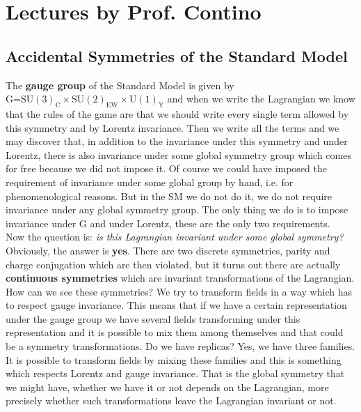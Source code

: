 \documentclass[../main.tex]{subfiles}
\begin{document}
\setchapterpreamble[u]{\margintoc}
\chapter[Lectures by Prof. Contino]{Lectures by Prof. Contino\footnotemark[0]}
\section{Accidental Symmetries of the Standard Model}
The \textbf{gauge group} of the Standard Model is given by\\ G=SU$(3)_{\text{C}}\times$SU$(2)_{\text{EW}}\times$U$(1)_{\text{Y}}$ and when we write the Lagrangian we know that the rules of the game are that we should write every single term allowed by this symmetry and by Lorentz invariance. Then we write all the terms and we may discover that, in addition to the invariance under this symmetry and under Lorentz, there is also invariance under some global symmetry group which comes for free because we did not impose it. Of course we could have imposed the requirement of invariance under some global group by hand, i.e. for phenomenological reasons. But in the SM we do not do it, we do not require invariance under any global symmetry group. The only thing we do is to impose invariance under G and under Lorentz, these are the only two requirements.\\
Now the question is: \textit{is this Lagrangian invariant under some global symmetry?} Obviously, the answer is \textbf{yes}. There are two discrete symmetries, parity and charge conjugation which are then violated, but it turns out there are actually \textbf{continuous symmetries} which are invariant transformations of the Lagrangian. How can we see these symmetries? We try to transform fields in a way which has to respect gauge invariance. This means that if we have a certain representation under the gauge group we have several fields transforming under this representation and it is possible to mix them among themselves and that could be a symmetry transformations. Do we have replicas? Yes, we have three families. It is possible to transform fields by mixing these families and this is something which respects Lorentz and gauge invariance. That is the global symmetry that we might have, whether we have it or not depends on the Lagrangian, more precisely whether such transformations leave the Lagrangian invariant or not.\\ 
\end{document}
